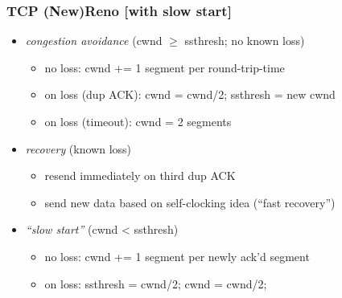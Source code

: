 \begin{frame}
\frametitle{TCP (New)Reno [with slow start]}
\begin{itemize}
    \item \textit{congestion avoidance} (cwnd $\ge$ ssthresh; no known loss)
        \begin{itemize}
        \item no loss: cwnd += 1 segment per round-trip-time
        \item on loss (dup ACK): cwnd = cwnd/2; ssthresh = new cwnd
        \item on loss (timeout): cwnd = 2 segments
        \end{itemize}
    \item \textit{recovery} (known loss)
        \begin{itemize}
        \item resend immediately on third dup ACK
        \item send new data based on self-clocking idea (``fast recovery'')
        \end{itemize}
    \item \textit{``slow start''} (cwnd < ssthresh)
        \begin{itemize}
        \item no loss: cwnd += 1 segment per newly ack'd segment
        \item on loss: ssthresh = cwnd/2; cwnd = cwnd/2;
        \end{itemize}
    \end{itemize}
\end{frame}
